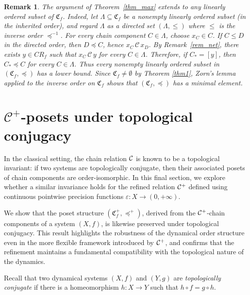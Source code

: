\documentclass[pdflatex,sn-mathphys-num]{sn-jnl}
\theoremstyle{thmstyleone}%
\theoremstyle{thmstyletwo}%
\newtheorem{rem}{Remark}%
\theoremstyle{thmstylethree}%
\begin{document}
\begin{rem}\label{rem_minimal}
The argument of Theorem~\ref{thm_max} extends to any linearly ordered subset of $\mathfrak{C}_f$. 
Indeed, let $\Lambda\subseteq \mathfrak{C}_f$ be a nonempty linearly ordered subset (in the inherited order), and regard $\Lambda$ as a directed set $(\Lambda,\le)$ where $\le$ is the inverse order $\preceq^{-1}$. 
For every chain component $C\in\Lambda$, choose $x_C\in C$. 
If $C\leq D$ in the directed order, then
$D\preceq C$, hence $x_C\,\mathcal{C}\,x_D$. By Remark~\ref{rem_net}, there exists
$y\in CR_f$ such that $x_C\,\mathcal{C}\,y$ for every $C\in\Lambda$.
Therefore, if $C_*=[y]$, then $C_*\preceq C$ for every $C\in\Lambda$.
Thus every nonempty linearly ordered subset in $(\mathfrak{C}_f,\preceq)$ has a lower bound.
Since $\mathfrak{C}_f\neq\emptyset$ by Theorem \ref{thm1}, Zorn's lemma
applied to the inverse order on $\mathfrak{C}_f$ shows that
$(\mathfrak{C}_f,\preceq)$ has a minimal element.
\end{rem}


\section{$\mathcal{C}^+$-posets under topological conjugacy}

In the classical setting, the chain relation ${\cal C}$ is known to be a topological invariant: if two systems are topologically conjugate, then their associated posets of chain components are order-isomorphic. In this final section, we explore whether a similar invariance holds for the refined relation ${\cal C}^+$ defined using continuous pointwise precision functions \(\varepsilon : X \to (0, +\infty)\).

\noindent We show that the poset structure $(\mathfrak{C}_f^+, \preceq^+)$, derived from the ${\cal C}^+$-chain components of a system $(X,f)$, is likewise preserved under topological conjugacy. This result highlights the robustness of the dynamical order structure even in the more flexible framework introduced by ${\cal C}^+$, and confirms that the refinement maintains a fundamental compatibility with the topological nature of the dynamics.

\noindent Recall that two dynamical systems $(X,f)$ and $(Y,g)$ are \emph{topologically conjugate} if there is a homeomorphism $h:X\rightarrow Y$ such that $h\circ f=g\circ h$.
\end{document}
